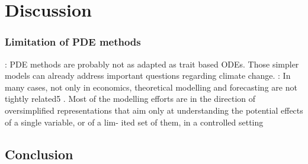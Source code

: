 %
\chapter{Discussion}
\label{sec:conclusion}

\subsection{Limitation of PDE methods}
\cite{Akesson2021} : PDE methods are probably not as adapted as trait based ODEs. Those simpler models can already address important questions regarding climate change.
\cite{Tacchella2018}: In many cases, not only in economics, theoretical modelling and forecasting are not tightly related5
. Most of the modelling efforts are
in the direction of oversimplified representations that aim only at understanding the potential effects of a single variable, or of a lim- ited set of them, in a controlled setting
\section{Conclusion}
